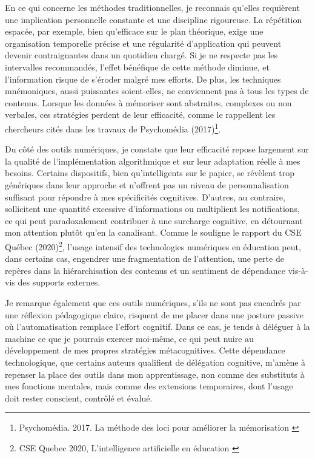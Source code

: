 \documentclass[11pt,a4paper]{report}
\begin{document}
En ce qui concerne les méthodes traditionnelles, je reconnais qu’elles requièrent une implication personnelle constante et une discipline rigoureuse. La répétition espacée, par exemple, bien qu’efficace sur le plan théorique, exige une organisation temporelle précise et une régularité d’application qui peuvent devenir contraignantes dans un quotidien chargé. Si je ne respecte pas les intervalles recommandés, l’effet bénéfique de cette méthode diminue, et l’information risque de s’éroder malgré mes efforts. De plus, les techniques mnémoniques, aussi puissantes soient-elles, ne conviennent pas à tous les types de contenus. Lorsque les données à mémoriser sont abstraites, complexes ou non verbales, ces stratégies perdent de leur efficacité, comme le rappellent les chercheurs cités dans les travaux de Psychomédia (2017)\footnote{Psychomédia. 2017. La méthode des loci pour améliorer la mémorisation \cite{psychomédia}}.

Du côté des outils numériques, je constate que leur efficacité repose largement sur la qualité de l’implémentation algorithmique et sur leur adaptation réelle à mes besoins. Certains dispositifs, bien qu’intelligents sur le papier, se révèlent trop génériques dans leur approche et n’offrent pas un niveau de personnalisation suffisant pour répondre à mes spécificités cognitives. D’autres, au contraire, sollicitent une quantité excessive d’informations ou multiplient les notifications, ce qui peut paradoxalement contribuer à une surcharge cognitive, en détournant mon attention plutôt qu’en la canalisant. Comme le souligne le rapport du CSE Québec (2020)\footnote{CSE Quebec 2020, L’intelligence artificielle en éducation \cite{hypotheses}}, l’usage intensif des technologies numériques en éducation peut, dans certains cas, engendrer une fragmentation de l’attention, une perte de repères dans la hiérarchisation des contenus et un sentiment de dépendance vis-à-vis des supports externes.

Je remarque également que ces outils numériques, s’ils ne sont pas encadrés par une réflexion pédagogique claire, risquent de me placer dans une posture passive où l’automatisation remplace l’effort cognitif. Dans ce cas, je tends à déléguer à la machine ce que je pourrais exercer moi-même, ce qui peut nuire au développement de mes propres stratégies métacognitives. Cette dépendance technologique, que certains auteurs qualifient de délégation cognitive, m’amène à repenser la place des outils dans mon apprentissage, non comme des substituts à mes fonctions mentales, mais comme des extensions temporaires, dont l’usage doit rester conscient, contrôlé et évalué.
\end{document}
